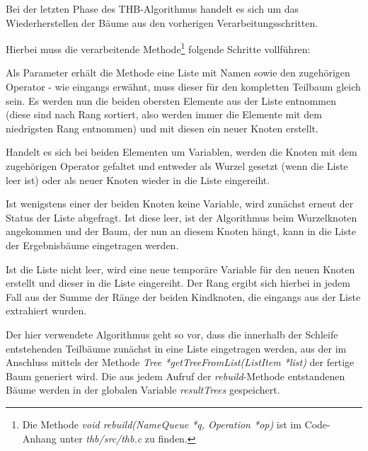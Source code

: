 Bei der letzten Phase des \ac{THB}-Algorithmus handelt es sich um das Wiederherstellen der Bäume aus den vorherigen Verarbeitungsschritten.

Hierbei muss die verarbeitende Methode\footnote{Die Methode \textit{void rebuild(NameQueue *q, Operation *op)} ist im Code-Anhang unter \textit{thb/src/thb.c} zu finden.} folgende Schritte vollführen:

Als Parameter erhält die Methode eine Liste mit Namen sowie den zugehörigen Operator - wie eingangs erwähnt, muss dieser für den kompletten Teilbaum gleich sein. Es werden nun die beiden obersten Elemente aus der Liste entnommen (diese sind nach Rang sortiert, also werden immer die Elemente mit dem niedrigsten Rang entnommen) und mit diesen ein neuer Knoten erstellt.

Handelt es sich bei beiden Elementen um Variablen, werden die Knoten mit dem zugehörigen Operator gefaltet und entweder als Wurzel gesetzt (wenn die Liste leer ist) oder als neuer Knoten wieder in die Liste eingereiht.

Ist wenigstens einer der beiden Knoten keine Variable, wird zunächst erneut der Status der Liste abgefragt. Ist diese leer, ist der Algorithmus beim Wurzelknoten angekommen und der Baum, der nun an diesem Knoten hängt, kann in die Liste der Ergebnisbäume eingetragen werden.

Ist die Liste nicht leer, wird eine neue temporäre Variable für den neuen Knoten erstellt und dieser in die Liste eingereiht. Der Rang ergibt sich hierbei in jedem Fall aus der Summe der Ränge der beiden Kindknoten, die eingangs aus der Liste extrahiert wurden.

Der hier verwendete Algorithmus geht so vor, dass die innerhalb der Schleife entstehenden Teilbäume zunächst in eine Liste eingetragen werden, aus der im Anschluss mittels der Methode \textit{Tree *getTreeFromList(ListItem *list)} der fertige Baum generiert wird. Die aus jedem Aufruf der \textit{rebuild}-Methode entstandenen Bäume werden in der globalen Variable \textit{resultTrees} gespeichert.